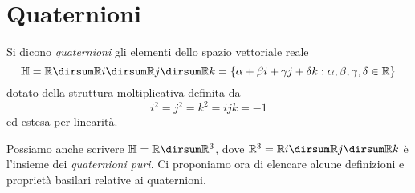 \section{Quaternioni}
\begin{definition}
Si dicono \emph{quaternioni} gli elementi dello spazio vettoriale reale
$$
\mathbb{H}=\mathbb{R}\dirsum\mathbb{R}i\dirsum\mathbb{R}j\dirsum\mathbb{R}k=\{\alpha+\beta i+\gamma j+\delta k:\alpha,\beta,\gamma,\delta\in\mathbb{R}\}
$$
dotato della struttura moltiplicativa definita da
$$
i^2=j^2=k^2=ijk=-1
$$
ed estesa per linearità.
\end{definition}
Possiamo anche scrivere $\mathbb{H}=\mathbb{R}\dirsum\mathbb{R}^3$, dove $\mathbb{R}^3=\mathbb{R}i\dirsum\mathbb{R}j\dirsum\mathbb{R}k$ è l'insieme dei \emph{quaternioni puri}. Ci proponiamo ora di elencare alcune definizioni e proprietà basilari relative ai quaternioni.
